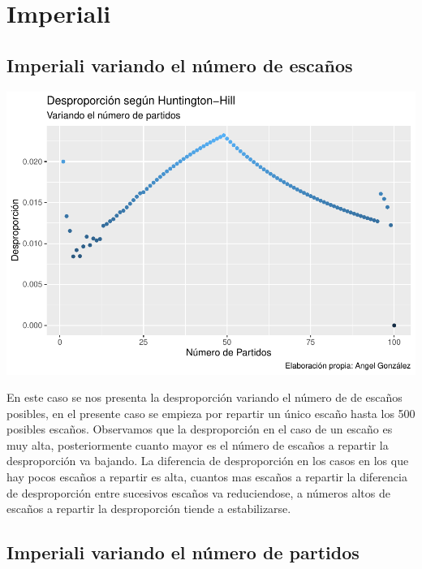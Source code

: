 \documentclass[12pt,a4paper,]{book}
\numberwithin{dummy}{section}
\theoremstyle{ocrenumbox}
\theoremstyle{blacknumex}
\theoremstyle{blacknumbox}
\theoremstyle{ocrenum}
\theoremstyle{ocrenum}
\begin{document}
\hypertarget{imperiali}{%
\section{Imperiali}\label{imperiali}}

\hypertarget{imperiali-variando-el-nuxfamero-de-escauxf1os}{%
\subsection{Imperiali variando el número de
escaños}\label{imperiali-variando-el-nuxfamero-de-escauxf1os}}

\begin{center}\includegraphics[width=0.95\linewidth]{figurasR/unnamed-chunk-27-1} \end{center}

En este caso se nos presenta la desproporción variando el número de de
escaños posibles, en el presente caso se empieza por repartir un único
escaño hasta los 500 posibles escaños. Observamos que la desproporción
en el caso de un escaño es muy alta, posteriormente cuanto mayor es el
número de escaños a repartir la desproporción va bajando. La diferencia
de desproporción en los casos en los que hay pocos escaños a repartir es
alta, cuantos mas escaños a repartir la diferencia de desproporción
entre sucesivos escaños va reduciendose, a números altos de escaños a
repartir la desproporción tiende a estabilizarse.

\hypertarget{imperiali-variando-el-nuxfamero-de-partidos}{%
\subsection{Imperiali variando el número de
partidos}\label{imperiali-variando-el-nuxfamero-de-partidos}}
\end{document}
